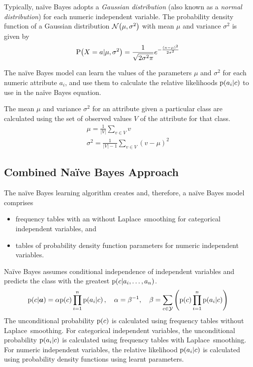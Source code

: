 Typically, na\"{i}ve Bayes adopts a \emph{Gaussian distribution} (also known as a \emph{normal distribution}) for each numeric independent variable.
The probability density function of a Gaussian distribution \( \mathrm{\mathcal{N}}\!\left( \mu, \sigma^{2} \right) \) with mean \( \mu \) and variance \( \sigma^{2} \) is given by
\begin{equation*}
  \mathrm{P}\!\left( X = a \vert \mu, \sigma^{2} \right) = \frac{1}{\sqrt{2 \sigma^{2} \pi}} e^{- \frac{\left( a - \mu \right)^{2}}{2 \sigma^{2}}}
\end{equation*}

The na\"{i}ve Bayes model can learn the values of the parameters \( \mu \) and \( \sigma^{2} \) for each numeric attribute \( a_{i} \), and use them to calculate the relative likelihoods \( \mathrm{p}\!\left( a_{i} \vert c \right) \) to use in the na\"{i}ve Bayes equation.

The mean \( \mu \) and variance \( \sigma^{2} \) for an attribute given a particular class are calculated using the set of observed values \( V \) of the attribute for that class.
\begin{gather*}
  \mu = \frac{1}{\left\lvert V \right\rvert} \sum_{v \in V} v \\
  \sigma^{2} = \frac{1}{\left\lvert V \right\rvert - 1} \sum_{v \in V} \left( v - \mu \right)^{2}
\end{gather*}

\subsection{Combined Na\"{i}ve Bayes Approach}

The na\"{i}ve Bayes learning algorithm creates and, therefore, a na\"{i}ve Bayes model comprises
\begin{itemize}
  \item frequency tables with an without Laplace~smoothing for categorical independent variables, and
  \item tables of probability density function parameters for numeric independent variables.
\end{itemize}

Na\"{i}ve Bayes assumes conditional independence of independent variables and predicts the class with the greatest \( \mathrm{p}\!\left( c \vert a_{i}, \ldots, a_{n} \right) \).
\begin{equation*}
  \mathrm{p}\!\left( c \vert \boldsymbol{a} \right) = \alpha \mathrm{p}\!\left( c \right) \prod_{i=1}^{n} \mathrm{p}\!\left( a_{i} \vert c \right), \quad \alpha = \beta^{-1}, \quad \beta = \sum_{c \in \mathcal{Y}} \left( \mathrm{p}\!\left( c \right) \prod_{i=1}^{n} \mathrm{p}\!\left( a_{i} \vert c \right) \right)
\end{equation*}
The unconditional probability \( \mathrm{p}\!\left( c \right) \) is calculated using frequency tables without Laplace~smoothing.
For categorical independent variables, the unconditional probability \( \mathrm{p}\!\left( a_{i} \vert c \right) \) is calculated using frequency tables with Laplace~smoothing.
For numeric independent variables, the relative likelihood \( \mathrm{p}\!\left( a_{i} \vert c \right) \) is calculated using probability density functions using learnt parameters.

